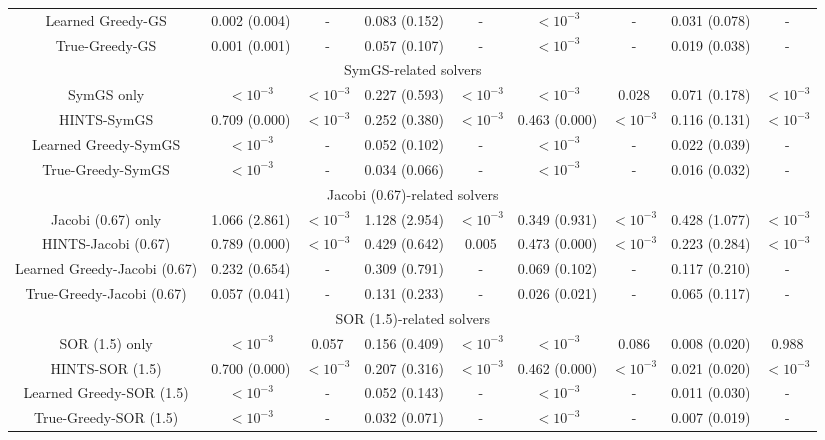 \documentclass{article}
\begin{document}
\begin{table}[h]
{\begin{tabular}{ccccccccc}
Learned Greedy-GS & 0.002 (0.004) & - & 0.083 (0.152) & - & $<10^{-3}$ & - & 0.031 (0.078) & - \\
True-Greedy-GS & 0.001 (0.001) & - & 0.057 (0.107) & - & $<10^{-3}$ & - & 0.019 (0.038) & - \\
\hline
         \multicolumn{9}{c}{SymGS-related solvers}\\
         \hline
SymGS only & $<10^{-3}$ & $<10^{-3}$ & 0.227 (0.593) & $<10^{-3}$ 
& $<10^{-3}$ & 0.028 & 0.071 (0.178) & $<10^{-3}$ \\
HINTS-SymGS & 0.709 (0.000) & $<10^{-3}$ & 0.252 (0.380) & $<10^{-3}$ 
& 0.463 (0.000) & $<10^{-3}$ & 0.116 (0.131) & $<10^{-3}$ \\
Learned Greedy-SymGS & $<10^{-3}$ & - & 0.052 (0.102) & - 
& $<10^{-3}$ & - & 0.022 (0.039) & - \\
True-Greedy-SymGS & $<10^{-3}$ & - & 0.034 (0.066) & - 
& $<10^{-3}$ & - & 0.016 (0.032) & - \\
\hline
         \multicolumn{9}{c}{Jacobi (0.67)-related solvers}\\
         \hline
Jacobi (0.67) only & 1.066 (2.861) & $<10^{-3}$ & 1.128 (2.954) & $<10^{-3}$ & 0.349 (0.931) & $<10^{-3}$ & 0.428 (1.077) & $<10^{-3}$ \\
HINTS-Jacobi (0.67) & 0.789 (0.000) & $<10^{-3}$ & 0.429 (0.642) & 0.005 & 0.473 (0.000) & $<10^{-3}$ & 0.223 (0.284) & $<10^{-3}$ \\
Learned Greedy-Jacobi (0.67) & 0.232 (0.654) & - & 0.309 (0.791) & - & 0.069 (0.102) & - & 0.117 (0.210) & - \\
True-Greedy-Jacobi (0.67) & 0.057 (0.041) & - & 0.131 (0.233) & - & 0.026 (0.021) & - & 0.065 (0.117) & - \\
\hline
         \multicolumn{9}{c}{SOR (1.5)-related solvers}\\
         \hline
SOR (1.5) only & $<10^{-3}$ & 0.057 & 0.156 (0.409) & $<10^{-3}$ & $<10^{-3}$ & 0.086 & 0.008 (0.020) & 0.988 \\
HINTS-SOR (1.5) & 0.700 (0.000) & $<10^{-3}$ & 0.207 (0.316) & $<10^{-3}$ & 0.462 (0.000) & $<10^{-3}$ & 0.021 (0.020) & $<10^{-3}$ \\
Learned Greedy-SOR (1.5) & $<10^{-3}$ & - & 0.052 (0.143) & - & $<10^{-3}$ & - & 0.011 (0.030) & - \\
True-Greedy-SOR (1.5) & $<10^{-3}$ & - & 0.032 (0.071) & - 
& $<10^{-3}$ & - & 0.007 (0.019) & - \\
\hline \hline 
    \end{tabular}
    }
    \label{tab:errorcomparison3}
\end{table}
\end{document}
